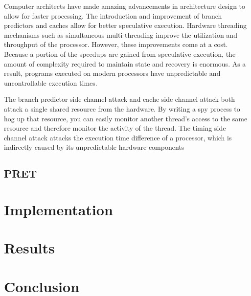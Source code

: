 \documentclass[times, 10pt,twocolumn]{article}
\begin{document}
Computer architects have made amazing advancements in architecture design to allow for faster processing. The introduction and improvement of branch predictors and caches allow for better speculative execution. Hardware threading mechanisms such as simultaneous multi-threading improve the utilization and throughput of the processor. However, these improvements come at a cost. Because a portion of the speedups are gained from speculative execution, the amount of complexity required to maintain state and recovery is enormous. As a result, programs executed on modern processors have unpredictable and uncontrollable execution times. 

The branch predictor side channel attack and cache side channel attack both attack a single shared resource from the hardware. By writing a spy process to hog up that resource, you can easily monitor another thread's access to the same resource and therefore monitor the activity of the thread. The timing side channel attack attacks the execution time difference of a processor, which is indirectly caused by its unpredictable hardware components

\subsection{PRET}


\section{Implementation}

\section{Results}



\section{Conclusion}




\end{document}
